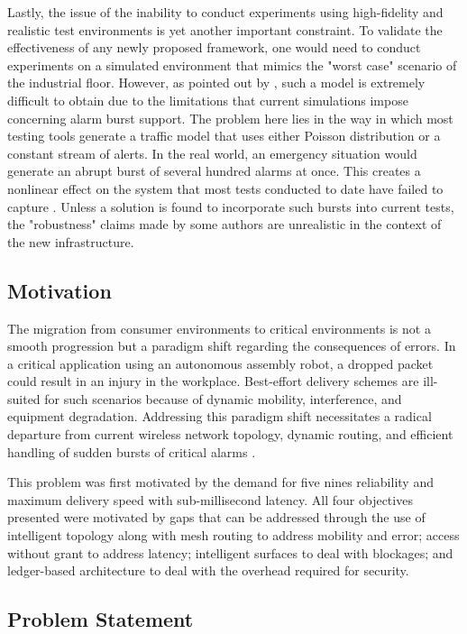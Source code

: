 \documentclass[a4paper,fleqn]{cas-dc}
\numberwithin{equation}{section}
\begin{document}
Lastly, the issue of the inability to conduct experiments using high-fidelity and realistic test environments is yet another important constraint. To validate the effectiveness of any newly proposed framework, one would need to conduct experiments on a simulated environment that mimics the "worst case" scenario of the industrial floor. However, as pointed out by \cite{b6}, such a model is extremely difficult to obtain due to the limitations that current simulations impose concerning alarm burst support. The problem here lies in the way in which most testing tools generate a traffic model that uses either Poisson distribution or a constant stream of alerts. In the real world, an emergency situation would generate an abrupt burst of several hundred alarms at once. This creates a nonlinear effect on the system that most tests conducted to date have failed to capture \cite{b6}. Unless a solution is found to incorporate such bursts into current tests, the "robustness" claims made by some authors are unrealistic in the context of the new infrastructure.

\subsection{Motivation}

The migration from consumer environments to critical environments is not a smooth progression but a paradigm shift regarding the consequences of errors. In a critical application using an autonomous assembly robot, a dropped packet could result in an injury in the workplace. Best-effort delivery schemes are ill-suited for such scenarios because of dynamic mobility, interference, and equipment degradation. Addressing this paradigm shift necessitates a radical departure from current wireless network topology, dynamic routing, and efficient handling of sudden bursts of critical alarms \cite{Chen_2021_Survey, b7}.

This problem was first motivated by the demand for five nines reliability and maximum delivery speed with sub-millisecond latency. All four objectives presented were motivated by gaps that can be addressed through the use of intelligent topology along with mesh routing to address mobility and error; access without grant to address latency; intelligent surfaces to deal with blockages; and ledger-based architecture to deal with the overhead required for security.

\subsection{Problem Statement}
\end{document}
